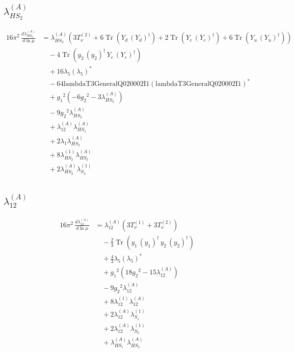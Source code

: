 \documentclass[10pt,a4paper]{article}
\begin{document}
\subsection*{$\lambda_{HS_2}^{(A)}$}
\begin{align*}
16\pi^2\,\frac{d \lambda_{HS_2}^{(A)}}{d\ln\mu} &={\lambda_{HS_2}^{(A)}} (3 T_{\nu}^{(2)}+6 \operatorname{Tr}\!\left({Y_d}\,\left({Y_d}\right)^{\dagger}\right)+2 \operatorname{Tr}\!\left({Y_e}\,\left({Y_e}\right)^{\dagger}\right)+6 \operatorname{Tr}\!\left({Y_u}\,\left({Y_u}\right)^{\dagger}\right)) \\
&\quad -4 \operatorname{Tr}\!\left({y_2}\,\left({y_2}\right)^{\dagger}\,{Y_e}\,\left({Y_e}\right)^{\dagger}\right) \\
&\quad +16 {\lambda_5} \left({\lambda_5}\right)^{*} \\
&\quad -64 \text{lambdaT3GeneralQ020002I1} \left(\text{lambdaT3GeneralQ020002I1}\right)^{*} \\
&\quad +{g_1}^2 \left(-6 {g_2}^2-3 {\lambda_{HS_2}^{(A)}}\right) \\
&\quad -9 {g_2}^2 {\lambda_{HS_2}^{(A)}} \\
&\quad +{\lambda_{12}^{(A)}} {\lambda_{HS_1}^{(A)}} \\
&\quad +2 {\lambda_1} {\lambda_{HS_2}^{(A)}} \\
&\quad +8 {\lambda_{HS_2}^{(1)}} {\lambda_{HS_2}^{(A)}} \\
&\quad +2 {\lambda_{HS_2}^{(A)}} {\lambda_{S_2}^{(1)}} \\
\end{align*}
\subsection*{$\lambda_{12}^{(A)}$}
\begin{align*}
16\pi^2\,\frac{d \lambda_{12}^{(A)}}{d\ln\mu} &={\lambda_{12}^{(A)}} (3 T_{\nu}^{(1)}+3 T_{\nu}^{(2)}) \\
&\quad -\frac{2}{3} \operatorname{Tr}\!\left({y_1}\,\left({y_1}\right)^{\dagger}\,{y_2}\,\left({y_2}\right)^{\dagger}\right) \\
&\quad +\frac{4}{3} {\lambda_5} \left({\lambda_5}\right)^{*} \\
&\quad +{g_1}^2 \left(18 {g_2}^2-15 {\lambda_{12}^{(A)}}\right) \\
&\quad -9 {g_2}^2 {\lambda_{12}^{(A)}} \\
&\quad +8 {\lambda_{12}^{(1)}} {\lambda_{12}^{(A)}} \\
&\quad +2 {\lambda_{12}^{(A)}} {\lambda_{S_1}^{(1)}} \\
&\quad +2 {\lambda_{12}^{(A)}} {\lambda_{S_2}^{(1)}} \\
&\quad +{\lambda_{HS_1}^{(A)}} {\lambda_{HS_2}^{(A)}} \\
\end{align*}
\end{document}
